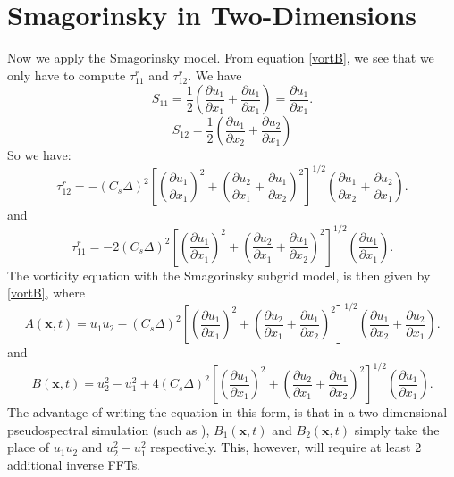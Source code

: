 \documentclass[11pt,a4paper]{article}
\begin{document}
\section{Smagorinsky in Two-Dimensions}
Now we apply the Smagorinsky model. From equation \ref{vortB}, we see that we only have to compute $\tau^r_{11}$ and $\tau^r_{12}$. We have 
$${S}_{11} = \frac{1}{2}\left( \frac{\partial {u}_1}{\partial x_1} + \frac{\partial {u}_1}{\partial x_1}\right) = \frac{\partial {u}_1}{\partial x_1}.$$
$${S}_{12} = \frac{1}{2}\left( \frac{\partial {u}_1}{\partial x_2} + \frac{\partial {u}_2}{\partial x_1}\right)$$
So we have:
\begin{equation}\label{tau12}
\tau_{12}^r= -(C_s \Delta)^2\left[\left( \frac{\partial {u}_1}{\partial x_1}\right)^2+\left( \frac{\partial {u}_2}{\partial x_1} + \frac{\partial {u}_1}{\partial x_2}\right)^2 \right]^{1/2}\left( \frac{\partial {u}_1}{\partial x_2} + \frac{\partial {u}_2}{\partial x_1}\right).
\end{equation}
and
\begin{equation}\label{tau11}
\tau_{11}^r= -2(C_s \Delta)^2\left[\left( \frac{\partial {u}_1}{\partial x_1}\right)^2+\left( \frac{\partial {u}_2}{\partial x_1} + \frac{\partial {u}_1}{\partial x_2}\right)^2 \right]^{1/2}\left(\frac{\partial {u}_1}{\partial x_1}\right).
\end{equation}
The vorticity equation with the Smagorinsky subgrid model, is then given by \ref{vortB}, where
$$A(\boldsymbol{x}, t) = u_1u_2 -(C_s \Delta)^2\left[\left( \frac{\partial {u}_1}{\partial x_1}\right)^2+\left( \frac{\partial {u}_2}{\partial x_1} + \frac{\partial {u}_1}{\partial x_2}\right)^2 \right]^{1/2}\left( \frac{\partial {u}_1}{\partial x_2} + \frac{\partial {u}_2}{\partial x_1}\right).$$
and 
$$B(\boldsymbol{x}, t) = u_2^2 - u_1^2 + 4(C_s \Delta)^2\left[\left( \frac{\partial {u}_1}{\partial x_1}\right)^2+\left( \frac{\partial {u}_2}{\partial x_1} + \frac{\partial {u}_1}{\partial x_2}\right)^2 \right]^{1/2}\left(\frac{\partial {u}_1}{\partial x_1}\right).$$
The advantage of writing the equation in this form, is that in a two-dimensional pseudospectral simulation (such as ), $B_1(\boldsymbol{x},t)$ and $B_2(\boldsymbol{x},t)$ simply take the place of $u_1u_2$ and $u_2^2 - u_1^2$ respectively. This, however, will require at least 2 additional inverse FFTs.
\end{document}
